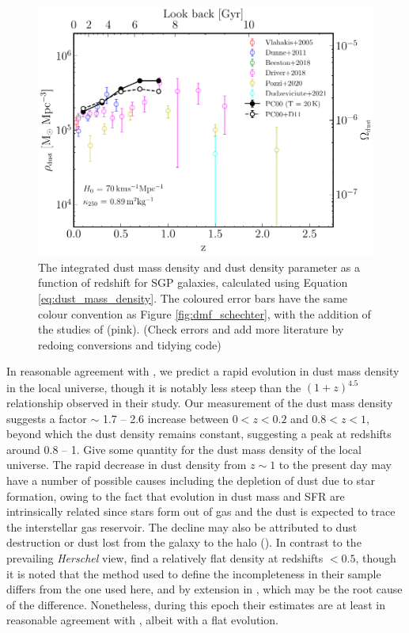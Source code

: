 \begin{figure}
	\centering
	\includegraphics[width=0.75\columnwidth]{Figures/dmd.pdf}
	\caption{The integrated dust mass density and dust density parameter as a function of redshift for SGP galaxies, calculated using Equation \ref{eq:dust_mass_density}. The coloured error bars have the same colour convention as Figure \ref{fig:dmf_schechter}, with the addition of the studies of \citealt{Driver_2018} (pink). {\color{red} (Check errors and add more literature by redoing conversions and tidying code)}}
	\label{fig:dmd}
\end{figure}

In reasonable agreement with \citealt{Dunne_2011}, we predict a rapid evolution in dust mass density in the local universe, though it is notably less steep than the $(1+z)^{4.5}$ relationship observed in their study. Our measurement of the dust mass density suggests a factor $\sim$ 1.7 -- 2.6 increase between $0 < z < 0.2$ and $0.8 < z < 1$, beyond which the dust density remains constant, suggesting a peak at redshifts around 0.8 -- 1. {\color{red}Give some quantity for the dust mass density of the local universe.} The rapid decrease in dust density from $z \sim 1$ to the present day may have a number of possible causes including the depletion of dust due to star formation, owing to the fact that evolution in dust mass and SFR are intrinsically related since stars form out of gas and the dust is expected to trace the interstellar gas reservoir. The decline may also be attributed to dust destruction or dust lost from the galaxy to the halo (\citealt{Dunne_2011}). In contrast to the prevailing \textit{Herschel} view, \citealt{Driver_2018} find a relatively flat density at redshifts $< 0.5$, though it is noted that the method used to define the incompleteness in their sample differs from the one used here, and by extension in \citealt{Dunne_2011}, which may be the root cause of the difference. Nonetheless, during this epoch their estimates are at least in reasonable agreement with \citealt{Dunne_2011}, albeit with a flat evolution.

